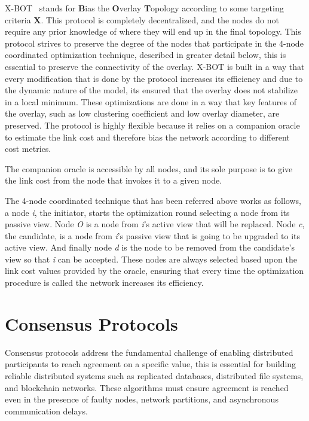 X-BOT~\cite{xbot} stands for \textbf{B}ias the \textbf{O}verlay \textbf{T}opology
according to some targeting criteria \textbf{X}. This protocol is completely decentralized,
and the nodes do not require any prior knowledge of where they will end up in the final topology. 
This protocol strives to preserve the degree of the nodes that participate in the 4-node coordinated
optimization technique, described in greater detail below, this is essential to preserve
the connectivity of the overlay. X-BOT is built in a way that every modification that is
done by the protocol increases its efficiency and due to the dynamic nature of the model,
its ensured that the overlay does not stabilize in a local minimum. These optimizations
are done in a way that key features of the overlay, such as low clustering coefficient and
low overlay diameter, are preserved. The protocol is highly flexible because it relies on a
companion oracle to estimate the link cost and therefore bias the network according to
different cost metrics.

The companion oracle is accessible by all nodes, and its sole purpose is to give the
link cost from the node that invokes it to a given node.

The 4-node coordinated technique that has been referred above works as follows, a
node \textit{i}, the initiator, starts the optimization round selecting a node from
its passive view. Node \textit{O} is a node from \textit{i}'s active view that
will be replaced. Node \textit{c}, the candidate, is a node from \textit{i}'s passive
view that is going to be upgraded to its active view. And finally node \textit{d}
is the node to be removed from the candidate's view so that \textit{i} can be accepted.
These nodes are always selected based upon the link cost values provided by the oracle,
ensuring that every time the optimization procedure is called the network increases its
efficiency.

\section{Consensus Protocols}\label{sec:consensus}

Consensus protocols address the fundamental challenge of enabling distributed participants 
to reach agreement on a specific value, this is essential for building reliable distributed 
systems such as replicated databases, distributed file systems, and blockchain networks.
These algorithms must ensure agreement is reached even in the presence of faulty nodes, 
network partitions, and asynchronous communication delays.


